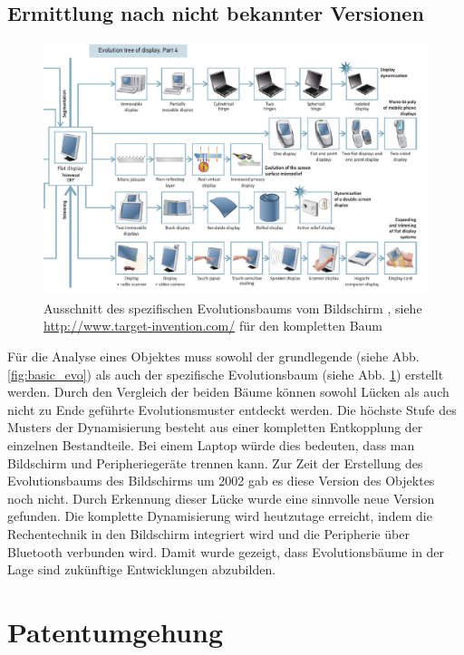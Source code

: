 \documentclass[11pt,a4paper]{article}
\begin{document}
\subsection{Ermittlung nach nicht bekannter Versionen}
\begin{figure}[htb]
  \centering
  \includegraphics[width=0.9\linewidth]{display.png}
  \caption{\small Ausschnitt des spezifischen Evolutionsbaums vom Bildschirm
    \cite{evo}, siehe \url{http://www.target-invention.com/} für den
    kompletten Baum}
  \label{fig:spez_evo}
\end{figure}

Für die Analyse eines Objektes muss sowohl der grundlegende (siehe
Abb. \ref{fig:basic_evo}) als auch der spezifische Evolutionsbaum (siehe
Abb. \ref{fig:spez_evo}) erstellt werden. Durch den Vergleich der beiden Bäume
können sowohl Lücken als auch nicht zu Ende geführte Evolutionsmuster entdeckt
werden. Die höchste Stufe des Musters der Dynamisierung besteht aus einer
kompletten Entkopplung der einzelnen Bestandteile. Bei einem Laptop würde dies
bedeuten, dass man Bildschirm und Peripheriegeräte trennen kann. Zur Zeit der
Erstellung des Evolutionsbaums des Bildschirms um 2002 gab es diese Version
des Objektes noch nicht. Durch Erkennung dieser Lücke wurde eine sinnvolle
neue Version gefunden. Die komplette Dynamisierung wird heutzutage erreicht,
indem die Rechentechnik in den Bildschirm integriert wird und die Peripherie
über Bluetooth verbunden wird. Damit wurde gezeigt, dass Evolutionsbäume in
der Lage sind zukünftige Entwicklungen abzubilden.

\section{Patentumgehung}
\end{document}
